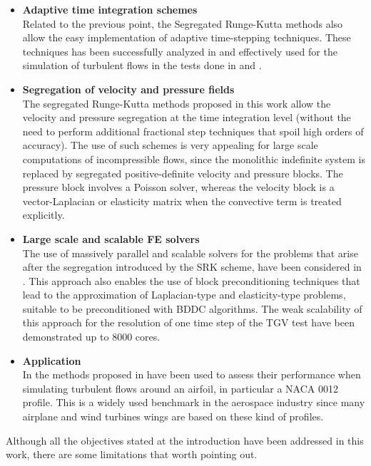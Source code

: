 \begin{itemize}
\item {\bf Adaptive time integration schemes}\\
Related to the previous point, the Segregated Runge-Kutta methods also allow the easy implementation of adaptive time-stepping techniques. These techniques has been successfully analyzed in  and effectively used for the simulation of turbulent flows in the tests done in  and .

\item {\bf Segregation of velocity and pressure fields}\\
The segregated Runge-Kutta methods proposed in this work allow the velocity and pressure segregation at the time integration level (without the need to perform additional fractional step techniques that spoil high orders of accuracy). The use of such schemes is very appealing for large scale computations of incompressible flows, since the monolithic indefinite system is replaced by segregated positive-definite velocity and pressure blocks. The pressure block involves a Poisson solver, whereas the velocity block is a vector-Laplacian or elasticity matrix when the convective term is treated explicitly.

\item {\bf Large scale and scalable FE solvers}\\
The use of massively parallel and scalable solvers for the problems that arise after the segregation introduced by the SRK scheme, have been considered in . This approach also enables the use of block preconditioning techniques that lead to the approximation of Laplacian-type and elasticity-type problems, suitable to be preconditioned with BDDC algorithms. The weak scalability of this approach for the resolution of one time step of the TGV test have been demonstrated up to 8000 cores.

\item {\bf Application}\\
In  the methods proposed in  have been used to assess their performance when simulating turbulent flows around an airfoil, in particular a NACA 0012 profile. This is a widely used  benchmark in the aerospace industry since many airplane and wind turbines wings are based on these kind of profiles.

\end{itemize}

Although all the objectives stated at the introduction have been addressed in this work, there are some limitations that worth pointing out. 

